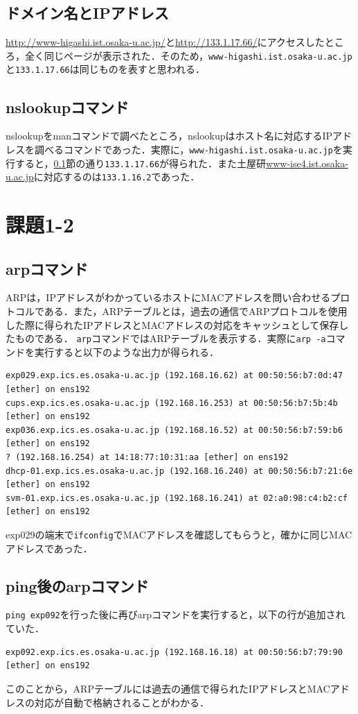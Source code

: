 \documentclass[a4j,10pt,titlepage]{jsarticle}
\begin{document}
\subsection{ドメイン名とIPアドレス}\label{sec:domainip}
\url{http://www-higashi.ist.osaka-u.ac.jp/}と\url{http://133.1.17.66/}にアクセスしたところ，全く同じページが表示された．そのため，\verb|www-higashi.ist.osaka-u.ac.jp|と\verb|133.1.17.66|は同じものを表すと思われる．

\subsection{nslookupコマンド}\label{sec:nslookup}
nslookupをmanコマンドで調べたところ，nslookupはホスト名に対応するIPアドレスを調べるコマンドであった．実際に，\verb|www-higashi.ist.osaka-u.ac.jp|を実行すると，\ref{sec:domainip}節の通り\verb|133.1.17.66|が得られた．また土屋研\url{www-ise4.ist.osaka-u.ac.jp}に対応するのは\verb|133.1.16.2|であった．



\section{課題1-2}
\subsection{arpコマンド}
ARPは，IPアドレスがわかっているホストにMACアドレスを問い合わせるプロトコルである．また，ARPテーブルとは，過去の通信でARPプロトコルを使用した際に得られたIPアドレスとMACアドレスの対応をキャッシュとして保存したものである．
\verb|arp|コマンドではARPテーブルを表示する．実際に\verb|arp -a|コマンドを実行すると以下のような出力が得られる．
\begin{verbatim}
exp029.exp.ics.es.osaka-u.ac.jp (192.168.16.62) at 00:50:56:b7:0d:47 [ether] on ens192
cups.exp.ics.es.osaka-u.ac.jp (192.168.16.253) at 00:50:56:b7:5b:4b [ether] on ens192
exp036.exp.ics.es.osaka-u.ac.jp (192.168.16.52) at 00:50:56:b7:59:b6 [ether] on ens192
? (192.168.16.254) at 14:18:77:10:31:aa [ether] on ens192
dhcp-01.exp.ics.es.osaka-u.ac.jp (192.168.16.240) at 00:50:56:b7:21:6e [ether] on ens192
svm-01.exp.ics.es.osaka-u.ac.jp (192.168.16.241) at 02:a0:98:c4:b2:cf [ether] on ens192
\end{verbatim}
exp029の端末で\verb|ifconfig|でMACアドレスを確認してもらうと，確かに同じMACアドレスであった．

\subsection{ping後のarpコマンド}
\verb|ping exp092|を行った後に再びarpコマンドを実行すると，以下の行が追加されていた．
\begin{verbatim}
exp092.exp.ics.es.osaka-u.ac.jp (192.168.16.18) at 00:50:56:b7:79:90 [ether] on ens192
\end{verbatim}
このことから，ARPテーブルには過去の通信で得られたIPアドレスとMACアドレスの対応が自動で格納されることがわかる．
\end{document}
